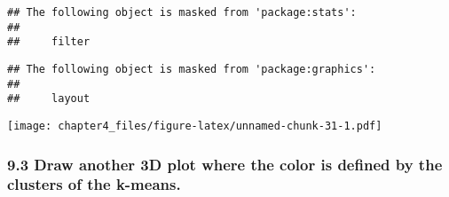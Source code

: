 \documentclass[
]{article}
\newenvironment{Shaded}{\begin{snugshade}}{\end{snugshade}}
\newcommand{\AttributeTok}[1]{\textcolor[rgb]{0.77,0.63,0.00}{#1}}
\newcommand{\CommentTok}[1]{\textcolor[rgb]{0.56,0.35,0.01}{\textit{#1}}}
\newcommand{\DecValTok}[1]{\textcolor[rgb]{0.00,0.00,0.81}{#1}}
\newcommand{\FunctionTok}[1]{\textcolor[rgb]{0.00,0.00,0.00}{#1}}
\newcommand{\NormalTok}[1]{#1}
\newcommand{\OtherTok}[1]{\textcolor[rgb]{0.56,0.35,0.01}{#1}}
\newcommand{\SpecialCharTok}[1]{\textcolor[rgb]{0.00,0.00,0.00}{#1}}
\newcommand{\StringTok}[1]{\textcolor[rgb]{0.31,0.60,0.02}{#1}}
\begin{document}
\begin{verbatim}
## The following object is masked from 'package:stats':
## 
##     filter
\end{verbatim}

\begin{verbatim}
## The following object is masked from 'package:graphics':
## 
##     layout
\end{verbatim}

\begin{Shaded}
\end{Shaded}

\texttt{[image: chapter4\_files/figure-latex/unnamed-chunk-31-1.pdf]}

\hypertarget{draw-another-3d-plot-where-the-color-is-defined-by-the-clusters-of-the-k-means.}{%
\subsubsection{9.3 Draw another 3D plot where the color is defined by
the clusters of the
k-means.}\label{draw-another-3d-plot-where-the-color-is-defined-by-the-clusters-of-the-k-means.}}
\end{document}

